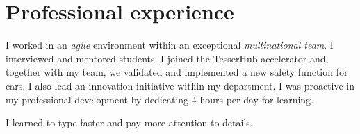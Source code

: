 %


\section{Professional experience}

{
\idea I worked in an \emph{agile} environment within an exceptional \emph{multinational team}.
\idea I interviewed and mentored students.
\idea I joined the TesserHub accelerator and, together with my team, we validated and implemented a new safety function for cars. I also lead an innovation initiative within my department.
\idea I was proactive in my professional development by dedicating 4 hours per day for learning.
}

{
\idea I learned to type faster and pay more attention to details.
}